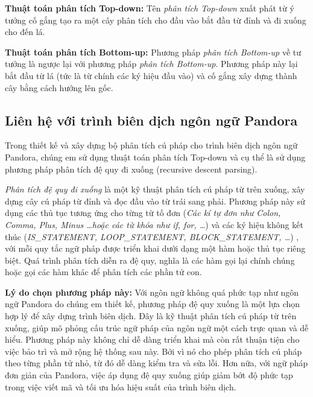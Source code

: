 \textbf{Thuật toán phân tích Top-down:}
Tên \textit{phân tích Top-down} xuất phát từ ý tưởng cố gắng tạo ra một cây phân tích cho đầu vào bắt đầu từ đỉnh và đi xuống cho đến lá.

\textbf{Thuật toán phân tích Bottom-up:}
Phương pháp \textit{phân tích Bottom-up} về tư tưởng là ngược lại với phương pháp \textit{phân tích Bottom-up}. Phương pháp này lại bắt đầu từ lá (tức là từ chính các ký hiệu đầu vào) và cố gắng xây dựng thành cây bằng cách hướng lên gốc.

\subsection{Liên hệ với trình biên dịch ngôn ngữ Pandora}
Trong thiết kế và xây dựng bộ phân tích cú pháp cho trình biên dịch ngôn ngữ Pandora, chúng em sử dụng thuật toán phân tích Top-down và cụ thể là sử dụng phương pháp phân tích đệ quy đi xuống (recursive descent parsing).

\textit{Phân tích đệ quy đi xuống} là một kỹ thuật phân tích cú pháp từ trên xuống, xây dựng cây cú pháp từ đỉnh và đọc đầu vào từ trái sang phải. Phương pháp này sử dụng các thủ tục tương ứng cho từng từ tố đơn (\textit{\emph{Các kí tự đơn như} Colon, Comma, Plus, Minus \dots \emph{hoặc các từ khóa như} if, for, \dots }) và các ký hiệu không kết thúc (\textit{IS\_STATEMENT, LOOP\_STATEMENT, BLOCK\_STATEMENT, \dots}) , với mỗi quy tắc ngữ pháp được triển khai dưới dạng một hàm hoặc thủ tục riêng biệt. Quá trình phân tích diễn ra đệ quy, nghĩa là các hàm gọi lại chính chúng hoặc gọi các hàm khác để phân tích các phần tử con.

\textbf{Lý do chọn phương pháp này:} Với ngôn ngữ không quá phức tạp như ngôn ngữ Pandora do chúng em thiết kế, phương pháp đệ quy xuống là một lựa chọn hợp lý để xây dựng trình biên dịch. Đây là kỹ thuật phân tích cú pháp từ trên xuống, giúp mô phỏng cấu trúc ngữ pháp của ngôn ngữ một cách trực quan và dễ hiểu. Phương pháp này không chỉ dễ dàng triển khai mà còn rất thuận tiện cho việc bảo trì và mở rộng hệ thống sau này. Bởi vì nó cho phép phân tích cú pháp theo từng phần tử nhỏ, từ đó dễ dàng kiểm tra và sửa lỗi. Hơn nữa, với ngữ pháp đơn giản của Pandora, việc áp dụng đệ quy xuống giúp giảm bớt độ phức tạp trong việc viết mã và tối ưu hóa hiệu suất của trình biên dịch.